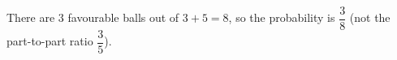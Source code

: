 There are $3$ favourable balls out of $3+5=8$, so the probability is $\boxed{\dfrac38}$ (not the part-to-part ratio $\dfrac35$).
